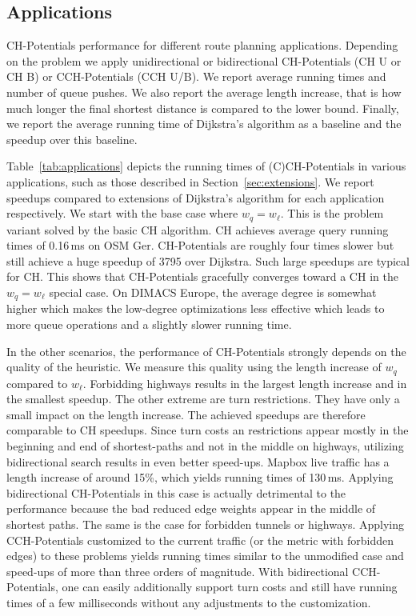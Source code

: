 \documentclass[manuscript,review]{acmart}
\begin{document}
\subsection{Applications}

\begin{table}
\centering
\caption{
CH-Potentials performance for different route planning applications.
Depending on the problem we apply unidirectional or bidirectional CH-Potentials (CH U or CH B) or CCH-Potentials (CCH U/B).
We report average running times and number of queue pushes.
We also report the average length increase, that is how much longer the final shortest distance is compared to the lower bound.
Finally, we report the average running time of Dijkstra's algorithm as a baseline and the speedup over this baseline.
}\label{tab:applications}

\end{table}

Table~\ref{tab:applications} depicts the running times of (C)CH-Potentials in various applications, such as those described in Section~\ref{sec:extensions}.
We report speedups compared to extensions of Dijkstra's algorithm for each application respectively.
We start with the base case where $w_q = w_\ell$.
This is the problem variant solved by the basic CH algorithm.
CH achieves average query running times of 0.16\,ms on OSM Ger.
CH-Potentials are roughly four times slower but still achieve a huge speedup of 3795 over Dijkstra.
Such large speedups are typical for CH.
This shows that CH-Potentials gracefully converges toward a CH in the $w_q = w_\ell$ special case.
On DIMACS Europe, the average degree is somewhat higher which makes the low-degree optimizations less effective which leads to more queue operations and a slightly slower running time.

In the other scenarios, the performance of CH-Potentials strongly depends on the quality of the heuristic.
We measure this quality using the length increase of $w_q$ compared to $w_\ell$.
Forbidding highways results in the largest length increase and in the smallest speedup.
The other extreme are turn restrictions.
They have only a small impact on the length increase.
The achieved speedups are therefore comparable to CH speedups.
Since turn costs an restrictions appear mostly in the beginning and end of shortest-paths and not in the middle on highways, utilizing bidirectional search results in even better speed-ups.
Mapbox live traffic has a length increase of around 15\%, which yields running times of 130\,ms.
Applying bidirectional CH-Potentials in this case is actually detrimental to the performance because the bad reduced edge weights appear in the middle of shortest paths.
The same is the case for forbidden tunnels or highways.
Applying CCH-Potentials customized to the current traffic (or the metric with forbidden edges) to these problems yields running times similar to the unmodified case and speed-ups of more than three orders of magnitude.
With bidirectional CCH-Potentials, one can easily additionally support turn costs and still have running times of a few milliseconds without any adjustments to the customization.
\end{document}
